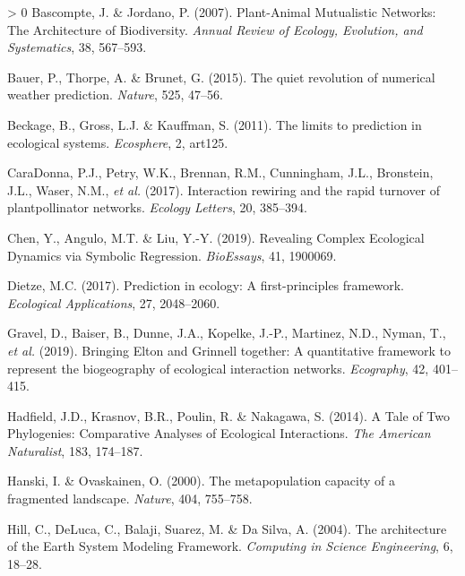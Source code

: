 \documentclass[11pt]{article}
\newlength{\cslhangindent}
\newenvironment{CSLReferences}[3] %
 {%
  \setlength{\parindent}{0pt}
  \ifodd #1 \everypar{\setlength{\hangindent}{\cslhangindent}}\ignorespaces\fi
  \ifnum #2 > 0
  \setlength{\parskip}{#2\baselineskip}
  \fi
 }%
 {}
\begin{document}
\hypertarget{refs}{}
\begin{CSLReferences}{1}{0}
\leavevmode\hypertarget{ref-Bascompte2007PlaMut}{}%
Bascompte, J. \& Jordano, P. (2007). Plant-Animal Mutualistic Networks:
The Architecture of Biodiversity. \emph{Annual Review of Ecology,
Evolution, and Systematics}, 38, 567--593.

\leavevmode\hypertarget{ref-Bauer2015QuiRev}{}%
Bauer, P., Thorpe, A. \& Brunet, G. (2015). The quiet revolution of
numerical weather prediction. \emph{Nature}, 525, 47--56.

\leavevmode\hypertarget{ref-Beckage2011LimPre}{}%
Beckage, B., Gross, L.J. \& Kauffman, S. (2011). The limits to
prediction in ecological systems. \emph{Ecosphere}, 2, art125.

\leavevmode\hypertarget{ref-CaraDonna2017IntRew}{}%
CaraDonna, P.J., Petry, W.K., Brennan, R.M., Cunningham, J.L.,
Bronstein, J.L., Waser, N.M., \emph{et al.} (2017). Interaction rewiring
and the rapid turnover of plantpollinator networks. \emph{Ecology
Letters}, 20, 385--394.

\leavevmode\hypertarget{ref-Chen2019RevCom}{}%
Chen, Y., Angulo, M.T. \& Liu, Y.-Y. (2019). Revealing Complex
Ecological Dynamics via Symbolic Regression. \emph{BioEssays}, 41,
1900069.

\leavevmode\hypertarget{ref-Dietze2017PreEco}{}%
Dietze, M.C. (2017). Prediction in ecology: A first-principles
framework. \emph{Ecological Applications}, 27, 2048--2060.

\leavevmode\hypertarget{ref-Gravel2019BriElt}{}%
Gravel, D., Baiser, B., Dunne, J.A., Kopelke, J.-P., Martinez, N.D.,
Nyman, T., \emph{et al.} (2019). Bringing Elton and Grinnell together: A
quantitative framework to represent the biogeography of ecological
interaction networks. \emph{Ecography}, 42, 401--415.

\leavevmode\hypertarget{ref-Hadfield2014TalTwo}{}%
Hadfield, J.D., Krasnov, B.R., Poulin, R. \& Nakagawa, S. (2014). A Tale
of Two Phylogenies: Comparative Analyses of Ecological Interactions.
\emph{The American Naturalist}, 183, 174--187.

\leavevmode\hypertarget{ref-Hanski2000MetCap}{}%
Hanski, I. \& Ovaskainen, O. (2000). The metapopulation capacity of a
fragmented landscape. \emph{Nature}, 404, 755--758.

\leavevmode\hypertarget{ref-Hill2004ArcEar}{}%
Hill, C., DeLuca, C., Balaji, Suarez, M. \& Da Silva, A. (2004). The
architecture of the Earth System Modeling Framework. \emph{Computing in
Science Engineering}, 6, 18--28.


\end{CSLReferences}
\end{document}
